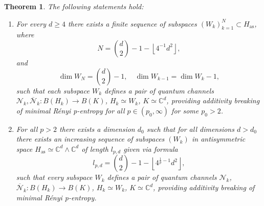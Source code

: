 \documentclass[reqno]{amsart}
\theoremstyle{plain}
\newtheorem{theorem}{Theorem}
\theoremstyle{note}
\newcommand{\floor}[1]{\left\lfloor #1 \right\rfloor}
\newcommand{\aspace}{H_{\mathrm{as}}}
\newcommand{\complexes}{\mathbb{C}}
\begin{document}
\begin{theorem}\label{thm:ResultSubspaces}
The following statements hold:
\begin{enumerate}
    \item\label{item:ResultSubspacesItem1} For every $d \geqslant 4$ there exists a finite sequence of subspaces $(W_k)_{k=1}^{N} \subset \aspace$, where
    \begin{equation}\label{eq:NumberOfSubspacesGeneral}
        N = \binom{d}{2} - 1 - \floor{4^{-1}d^2},
    \end{equation}
    and
    \begin{equation}
        \dim{W_{N}} = \binom{d}{2} - 1, \quad \dim{W_{k-1}} = \dim{W_k} - 1,
    \end{equation}
    such that each subspace $W_k$ defines a pair of quantum channels $\mathcal{N}_k, \overline{\mathcal{N}}_k  : B(H_k) \to B(K)$, $H_k\simeq W_k$, $K \simeq \complexes^d$, providing additivity breaking of minimal R\'{e}nyi \textit{p}-entropy for all $p\in (p_0,\infty)$ for some $p_0 > 2$.
    \item\label{item:ResultSubspacesItem2} For all $p>2$ there exists a dimension $d_0$ such that for all dimensions $d>d_0$ there exists an increasing sequence of subspaces $(W_k)$ in antisymmetric space $\aspace \simeq \complexes^d \wedge \complexes^d$ of length $l_{p,d}$ given via formula
\begin{equation}\label{eq:NumberOfSubspaces}
    l_{p,d} = \binom{d}{2}-1-\floor{4^{\frac{1}{p}-1}d^2},
\end{equation}
such that every subspace $W_k$ defines a pair of quantum channels $\mathcal{N}_k$, $\overline{\mathcal{N}}_k : B(H_k) \to B(K)$, $H_k \simeq W_k$, $K \simeq \complexes^d$, providing additivity breaking of minimal R\'{e}nyi \textit{p}-entropy.
\end{enumerate}
\end{theorem}
\end{document}
